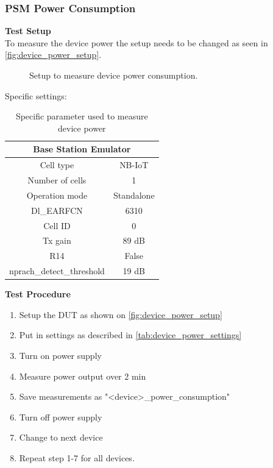 \subsubsection{\gls{PSM} Power Consumption}
\textbf{Test Setup}\\
To measure the device power the setup needs to be changed as seen in \autoref{fig:device_power_setup}.
\begin{figure}[H]
\centering
{}
\caption{Setup to measure device power consumption.}
\label{fig:device_power_setup}
\end{figure}

Specific settings:
\begin{table}[H]
\centering
\begin{tabular}{|c|c|} \hline
\multicolumn{2}{|c|}{\textbf{Base Station Emulator}} \\ \hline
Cell type          & NB-IoT         \\ \hline
Number of cells    & 1              \\ \hline
Operation mode     & Standalone     \\ \hline
Dl\_EARFCN         & 6310           \\ \hline
Cell ID            & 0              \\ \hline
Tx gain            & 89 dB          \\ \hline
R14                & False          \\ \hline
nprach\_detect\_threshold  & 19 dB  \\ \hline
\end{tabular}
\caption{Specific parameter used to measure device power}
\label{tab:device_power_settings}
\end{table}


\textbf{Test Procedure}\\
\begin{enumerate}
\item Setup the \gls{DUT} as shown on \autoref{fig:device_power_setup}
\item Put in settings as described in \autoref{tab:device_power_settings} 
\item Turn on power supply 
\item Measure power output over 2 min
\item Save measurements as "<device>\_power\_consumption"
\item Turn off power supply
\item Change to next device
\item Repeat step 1-7 for all devices.
\end{enumerate}

